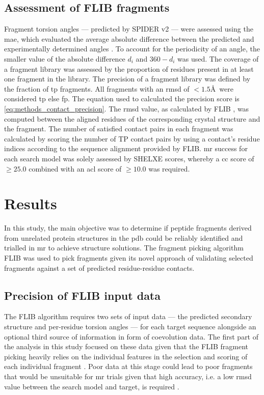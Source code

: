 \subsection{Assessment of FLIB fragments}
Fragment torsion angles --- predicted by SPIDER v2 \cite{Heffernan2015-bt} --- were assessed using the \gls{mae}, which evaluated the average absolute difference between the predicted and experimentally determined angles \cite{Heffernan2015-bt}. To account for the periodicity of an angle, the smaller value of the absolute difference $d_i$ and $360-d_i$ was used. The coverage of a fragment library was assessed by the proportion of residues present in at least one fragment in the library. The precision of a fragment library was defined by the fraction of \gls{tp} fragments. All fragments with an \gls{rmsd} of $<1.5$\AA\ were considered \gls{tp} else \gls{fp}. The equation used to calculated the precision score is \cref{eq:methods_contact_precision}. The \gls{rmsd} value, as calculated by FLIB \cite{De_Oliveira2015-kb}, was computed between the aligned residues of the corresponding crystal structure and the fragment. The number of satisfied contact pairs in each fragment was calculated by scoring the number of TP contact pairs by using a contact's residue indices according to the sequence alignment provided by FLIB. \Gls{mr} success for each search model was solely assessed by SHELXE scores, whereby a \gls{cc} score of $\geq25.0$ combined with an \gls{acl} score of $\geq10.0$ was required.

\section{Results}
In this study, the main objective was to determine if peptide fragments derived from unrelated protein structures in the \gls{pdb} could be reliably identified and trialled in \gls{mr} to achieve structure solutions. The fragment picking algorithm FLIB \cite{De_Oliveira2015-kb} was used to pick fragments given its novel approach of validating selected fragments against a set of predicted residue-residue contacts.

\subsection{Precision of FLIB input data}
The FLIB algorithm requires two sets of input data --- the predicted secondary structure and per-residue torsion angles --- for each target sequence alongside an optional third source of information in form of coevolution data. The first part of the analysis in this study focused on these data given that the FLIB fragment picking heavily relies on the individual features in the selection and scoring of each individual fragment \cite{De_Oliveira2015-kb}. Poor data at this stage could lead to poor fragments that would be unsuitable for \gls{mr} trials given that high accuracy, i.e. a low \gls{rmsd} value between the search model and target, is required \cite{Scapin2013-yp}.

